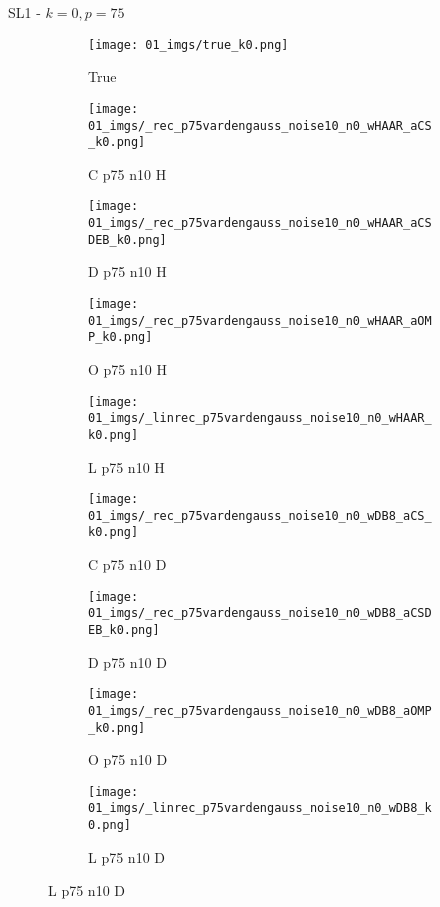\begin{frame}{SL1 - $k=0,p=75$}{}
\begin{figure}
\begin{subfigure}{0.1\textwidth}
\texttt{[image: 01\_imgs/true\_k0.png]}
\caption*{\Tiny True}
\end{subfigure}
\begin{subfigure}{0.1\textwidth}
\texttt{[image: 01\_imgs/\_rec\_p75vardengauss\_noise10\_n0\_wHAAR\_aCS\_k0.png]}
\caption*{\Tiny C p75 n10 H}
\end{subfigure}
\begin{subfigure}{0.1\textwidth}
\texttt{[image: 01\_imgs/\_rec\_p75vardengauss\_noise10\_n0\_wHAAR\_aCSDEB\_k0.png]}
\caption*{\Tiny D p75 n10 H}
\end{subfigure}
\begin{subfigure}{0.1\textwidth}
\texttt{[image: 01\_imgs/\_rec\_p75vardengauss\_noise10\_n0\_wHAAR\_aOMP\_k0.png]}
\caption*{\Tiny O p75 n10 H}
\end{subfigure}
\begin{subfigure}{0.1\textwidth}
\texttt{[image: 01\_imgs/\_linrec\_p75vardengauss\_noise10\_n0\_wHAAR\_k0.png]}
\caption*{\Tiny L p75 n10 H}
\end{subfigure}
\begin{subfigure}{0.1\textwidth}
\texttt{[image: 01\_imgs/\_rec\_p75vardengauss\_noise10\_n0\_wDB8\_aCS\_k0.png]}
\caption*{\Tiny C p75 n10 D}
\end{subfigure}
\begin{subfigure}{0.1\textwidth}
\texttt{[image: 01\_imgs/\_rec\_p75vardengauss\_noise10\_n0\_wDB8\_aCSDEB\_k0.png]}
\caption*{\Tiny D p75 n10 D}
\end{subfigure}
\begin{subfigure}{0.1\textwidth}
\texttt{[image: 01\_imgs/\_rec\_p75vardengauss\_noise10\_n0\_wDB8\_aOMP\_k0.png]}
\caption*{\Tiny O p75 n10 D}
\end{subfigure}
\begin{subfigure}{0.1\textwidth}
\texttt{[image: 01\_imgs/\_linrec\_p75vardengauss\_noise10\_n0\_wDB8\_k0.png]}
\caption*{\Tiny L p75 n10 D}
\end{subfigure}

\vspace{5pt}


\end{figure}
\end{frame}

